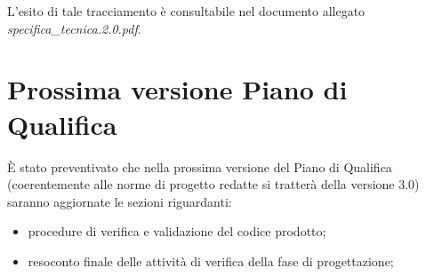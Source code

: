 L'esito di tale tracciamento è consultabile nel documento allegato \textit{specifica\_tecnica.2.0.pdf}.
\clearpage

\section{Prossima versione Piano di Qualifica}
È stato preventivato che nella prossima versione del Piano di Qualifica (coerentemente alle norme di progetto redatte si tratterà della versione 3.0) saranno aggiornate le sezioni riguardanti:
\begin{itemize}
\item procedure di verifica e validazione del codice prodotto;
\item resoconto finale delle attività di verifica della fase di progettazione;
\end{itemize}


